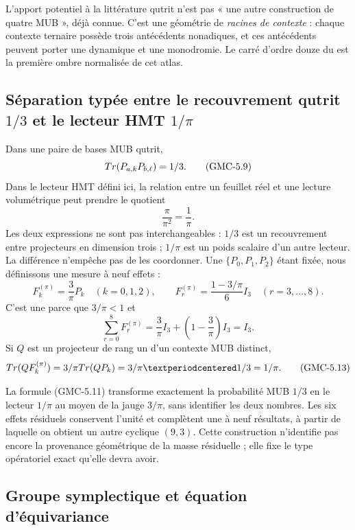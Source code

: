 L’apport potentiel à la littérature qutrit n’est pas « une autre construction de
quatre MUB », déjà connue. C’est une géométrie de \emph{racines de contexte} : chaque
contexte ternaire possède trois antécédents nonadiques, et ces antécédents
peuvent porter une dynamique et une monodromie. Le carré d’ordre douze du
 est la première ombre normalisée de cet atlas.

\subsection{Séparation typée entre le recouvrement qutrit
\texorpdfstring{$1/3$}{1/3} et le lecteur HMT
\texorpdfstring{$1/\pi$}{1/pi}}

Dans une paire de bases MUB qutrit,
\[
 Tr(P_{a,k}P_{b,\ell})=1/3.
 \tag{GMC-5.9}
\]
Dans le lecteur HMT défini ici, la relation entre un feuillet réel et une
lecture volumétrique peut prendre le quotient
\[
 \frac{\pi}{\pi^2}=\frac1\pi.
 \tag{GMC-5.10}
\]
Les deux expressions ne sont pas interchangeables : $1/3$ est un recouvrement entre
projecteurs en dimension trois ; $1/\pi$ est un poids scalaire d’un autre lecteur.
La différence n’empêche pas de les coordonner. Une \PVM
$\{P_0,P_1,P_2\}$ étant fixée, nous définissons une mesure à neuf effets :
\[
 F_k^{(\pi)}=\frac3\pi P_k\quad(k=0,1,2),
 \qquad
 F_r^{(\pi)}=\frac{1-3/\pi}{6}I_3\quad(r=3,\ldots,8).
 \tag{GMC-5.11}
\]
C’est une \POVM parce que $3/\pi<1$ et
\[
 \sum_{r=0}^{8}F_r^{(\pi)}
 =\frac3\pi I_3+\left(1-\frac3\pi\right)I_3=I_3.
 \tag{GMC-5.12}
\]
Si $Q$ est un projecteur de rang un d’un contexte MUB distinct,
\[
 \Tr(QF_k^{(\pi)})
 =\frac3\pi\Tr(QP_k)
 =\frac3\pi\cdot\frac13
 =\frac1\pi.
 \tag{GMC-5.13}
\]

\begin{bridgebox}
La formule \textup{(GMC-5.11)} transforme exactement la probabilité MUB $1/3$ en
le lecteur $1/\pi$ au moyen de la jauge $3/\pi$, sans identifier les deux nombres.
Les six effets résiduels conservent l’unité et complètent une \POVM à
neuf résultats, à partir de laquelle on obtient un autre \QMS cyclique $(9,3)$. Cette
construction n’identifie pas encore la provenance géométrique de la masse
résiduelle ; elle fixe le type opératoriel exact qu’elle devra avoir.
\end{bridgebox}

\subsection{Groupe symplectique et équation d’équivariance}

